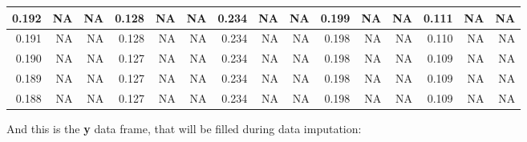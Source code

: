 \documentclass[
  table]{article}
\begin{document}
\begin{table}[H]
{\begin{tabular}[t]{r|r|r|r|r|r|r|r|r|r|r|r|r|r|r}
\hline
0.192 & NA & NA & 0.128 & NA & NA & 0.234 & NA & NA & 0.199 & NA & NA & 0.111 & NA & NA\\
\hline
0.191 & NA & NA & 0.128 & NA & NA & 0.234 & NA & NA & 0.198 & NA & NA & 0.110 & NA & NA\\
\hline
0.190 & NA & NA & 0.127 & NA & NA & 0.234 & NA & NA & 0.198 & NA & NA & 0.109 & NA & NA\\
\hline
0.189 & NA & NA & 0.127 & NA & NA & 0.234 & NA & NA & 0.198 & NA & NA & 0.109 & NA & NA\\
\hline
0.188 & NA & NA & 0.127 & NA & NA & 0.234 & NA & NA & 0.198 & NA & NA & 0.109 & NA & NA\\
\hline
\end{tabular}}
\end{table}

And this is the \textbf{y} data frame, that will be filled during data
imputation:
\end{document}
